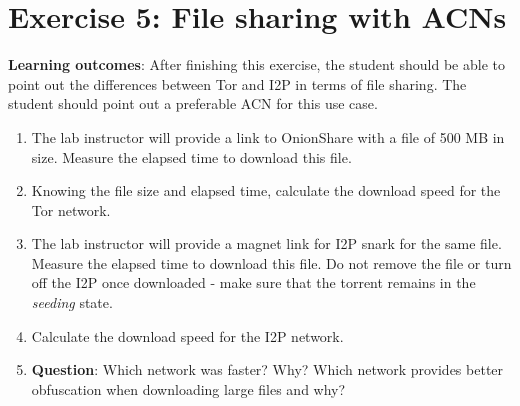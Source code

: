 \section*{Exercise 5: File sharing with ACNs}
\textbf{Learning outcomes}: After finishing this exercise, the student should be able to point out the differences between Tor and I2P in terms of file sharing. The student should point out a preferable ACN for this use case.
\begin{enumerate}
    \item The lab instructor will provide a link to OnionShare with a file of 500 MB in size. Measure the elapsed time to download this file.
    \item Knowing the file size and elapsed time, calculate the download speed for the Tor network.
    \item The lab instructor will provide a magnet link for I2P snark for the same file. Measure the elapsed time to download this file. Do not remove the file or turn off the I2P once downloaded - make sure that the torrent remains in the \textit{ seeding} state.
    \item Calculate the download speed for the I2P network.
    \item \textbf{Question}: Which network was faster? Why? Which network provides better obfuscation when downloading large files and why?
\end{enumerate}

